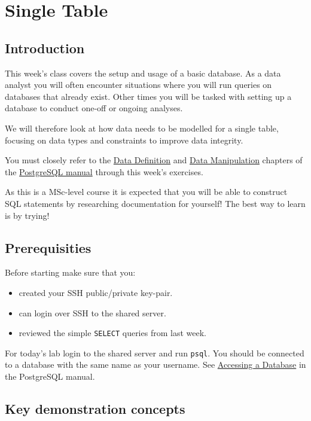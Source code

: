 \chapter{Single Table}

\section{Introduction}
\label{sec:introduction}

This week's class covers the setup and usage of a basic database.
As a data analyst you will often encounter situations where you will run queries on databases that already exist.
Other times you will be tasked with setting up a database to conduct one-off or ongoing analyses.

We will therefore look at how data needs to be modelled for a single table, focusing on data types and constraints to improve data integrity.

You must closely refer to the
\href{https://www.postgresql.org/docs/15/ddl.html}{Data Definition} and
\href{https://www.postgresql.org/docs/15/dml.html}{Data Manipulation}
chapters of the
\href{https://www.postgresql.org/docs/15/index.html}{PostgreSQL manual} through this week's exercises.

As this is a MSc-level course it is expected that you will be able to construct SQL statements by researching documentation for yourself!
The best way to learn is by trying!

\section{Prerequisities}
\label{sec:prerequisities}

Before starting make sure that you:

\begin{itemize}
\item
  created your SSH public/private key-pair.
\item
  can login over SSH to the shared server.
\item
  reviewed the simple \texttt{SELECT} queries from last week.
\end{itemize}

For today's lab login to the shared server and run \texttt{psql}. You
should be connected to a database with the same name as your username.
See
\href{https://www.postgresql.org/docs/14/tutorial-accessdb.html}{Accessing
a Database} in the PostgreSQL manual.

\section{Key demonstration concepts}\label{key-demonstration-concepts}

